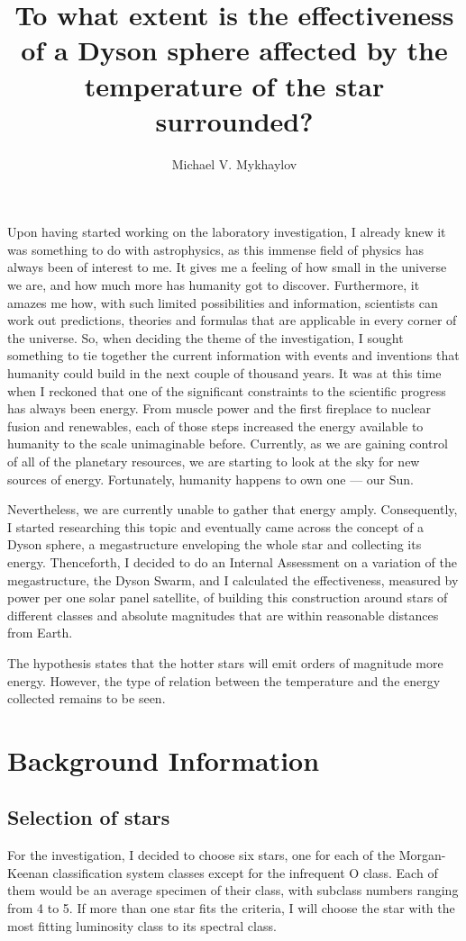 \documentclass[stu, 11pt, a4paper, floatsintext]{apa7}
\title{To what extent is the effectiveness of a Dyson sphere affected by the temperature of the star surrounded?}
\author{Michael V. Mykhaylov}
\begin{document}
	\maketitle
	Upon having started working on the laboratory investigation, I already knew it was something to do with astrophysics, as this immense field of physics has always been of interest to me. It gives me a feeling of how small in the universe we are, and how much more has humanity got to discover. Furthermore, it amazes me how, with such limited possibilities and information, scientists can work out predictions, theories and formulas that are applicable in every corner of the universe. So, when deciding the theme of the investigation, I sought something to tie together the current information with events and inventions that humanity could build in the next couple of thousand years. It was at this time when I reckoned that one of the significant constraints to the scientific progress has always been energy. From muscle power and the first fireplace to nuclear fusion and renewables, each of those steps increased the energy available to humanity to the scale unimaginable before. Currently, as we are gaining control of all of the planetary resources, we are starting to look at the sky for new sources of energy. Fortunately, humanity happens to own one — our Sun. 
	
	Nevertheless, we are currently unable to gather that energy amply. Consequently, I started researching this topic and eventually came across the concept of a Dyson sphere, a megastructure enveloping the whole star and collecting its energy. Thenceforth, I decided to do an Internal Assessment on a variation of the megastructure, the Dyson Swarm, and I calculated the effectiveness, measured by power per one solar panel satellite, of building this construction around stars of different classes and absolute magnitudes that are within reasonable distances from Earth.

	The hypothesis states that the hotter stars will emit orders of magnitude more energy. However, the type of relation between the temperature and the energy collected remains to be seen.
	\section{Background Information}
	\subsection{Selection of stars}
	For the investigation, I decided to choose six stars, one for each of the Morgan-Keenan classification system classes except for the infrequent O class. Each of them would be an average specimen of their class, with subclass numbers ranging from 4 to 5. If more than one star fits the criteria, I will choose the star with the most fitting luminosity class to its spectral class.
\end{document}
